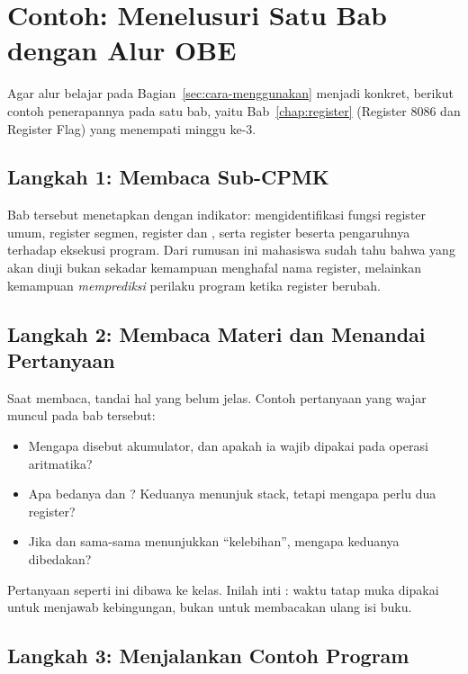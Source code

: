 \section{Contoh: Menelusuri Satu Bab dengan Alur OBE}
\label{sec:contoh-bab1}

Agar alur belajar pada Bagian~\ref{sec:cara-menggunakan} menjadi
konkret, berikut contoh penerapannya pada satu bab, yaitu
Bab~\ref{chap:register} (Register 8086 dan Register Flag) yang
menempati minggu ke-3.

\subsection{Langkah 1: Membaca Sub-CPMK}

Bab tersebut menetapkan  dengan indikator: mengidentifikasi
fungsi register umum, register segmen, register  dan
, serta register  beserta pengaruhnya terhadap
eksekusi program. Dari rumusan ini mahasiswa sudah tahu bahwa yang
akan diuji bukan sekadar kemampuan menghafal nama register, melainkan
kemampuan \emph{memprediksi} perilaku program ketika register berubah.

\subsection{Langkah 2: Membaca Materi dan Menandai Pertanyaan}

Saat membaca, tandai hal yang belum jelas. Contoh pertanyaan yang
wajar muncul pada bab tersebut:

\begin{itemize}
    \item Mengapa  disebut akumulator, dan apakah ia wajib
          dipakai pada operasi aritmatika?
    \item Apa bedanya  dan ? Keduanya menunjuk stack,
          tetapi mengapa perlu dua register?
    \item Jika  dan  sama-sama menunjukkan
          ``kelebihan'', mengapa keduanya dibedakan?
\end{itemize}

Pertanyaan seperti ini dibawa ke kelas. Inilah inti
: waktu tatap muka dipakai untuk menjawab
kebingungan, bukan untuk membacakan ulang isi buku.

\subsection{Langkah 3: Menjalankan Contoh Program}

